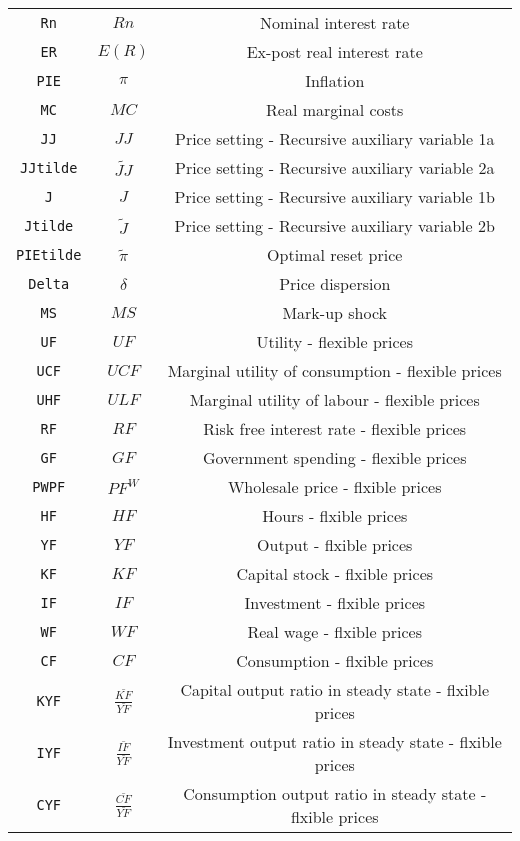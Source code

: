 \begin{center}
\begin{longtable}{ccc}
\texttt{Rn} & $Rn$ & Nominal interest rate\\
\texttt{ER} & $E(R)$ & Ex-post real interest rate\\
\texttt{PIE} & $\pi$ & Inflation\\
\texttt{MC} & $MC$ & Real marginal costs\\
\texttt{JJ} & $JJ$ & Price setting - Recursive auxiliary variable 1a\\
\texttt{JJtilde} & $\tilde{JJ}$ & Price setting - Recursive auxiliary variable 2a\\
\texttt{J} & $J$ & Price setting - Recursive auxiliary variable 1b\\
\texttt{Jtilde} & $\tilde{J}$ & Price setting - Recursive auxiliary variable 2b\\
\texttt{PIEtilde} & $\tilde{\pi}$ & Optimal reset price\\
\texttt{Delta} & $\delta$ & Price dispersion\\
\texttt{MS} & $MS$ & Mark-up shock\\
\texttt{UF} & $UF$ & Utility - flexible prices\\
\texttt{UCF} & $UCF$ & Marginal utility of consumption - flexible prices\\
\texttt{UHF} & $ULF$ & Marginal utility of labour - flexible prices\\
\texttt{RF} & $RF$ & Risk free interest rate - flexible prices\\
\texttt{GF} & $GF$ & Government spending - flexible prices\\
\texttt{PWPF} & $PF^{W}$ & Wholesale price - flxible prices\\
\texttt{HF} & $HF$ & Hours - flxible prices\\
\texttt{YF} & $YF$ & Output - flxible prices\\
\texttt{KF} & $KF$ & Capital stock - flxible prices\\
\texttt{IF} & $IF$ & Investment - flxible prices\\
\texttt{WF} & $WF$ & Real wage - flxible prices\\
\texttt{CF} & $CF$ & Consumption - flxible prices\\
\texttt{KYF} & $\frac{\bar{KF}}{\bar{YF}}$ & Capital output ratio in steady state - flxible prices\\
\texttt{IYF} & $\frac{\bar{IF}}{\bar{YF}}$ & Investment output ratio in steady state - flxible prices\\
\texttt{CYF} & $\frac{\bar{CF}}{\bar{YF}}$ & Consumption output ratio in steady state - flxible prices\\

\end{longtable}
\end{center}
